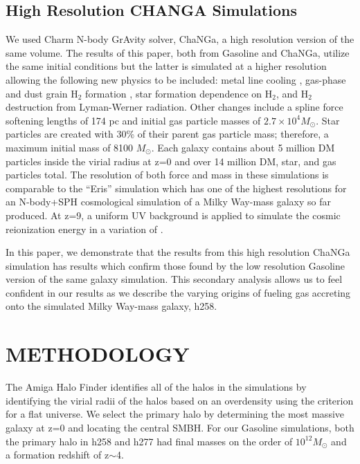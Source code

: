 \documentclass[12pt,headA,chapB]{fiskthesis}
\begin{document}
\section{\normalsize High Resolution CHANGA Simulations}

We used Charm N-body GrAvity solver, ChaNGa, a high resolution version of the same volume. The results of this paper, both from Gasoline and ChaNGa, utilize the same initial conditions but the latter is simulated at a higher resolution allowing the following new physics to be included: metal line cooling \citep{Christensen2012,Shen2010}, gas-phase and dust grain H$_2$ formation \citep{Christensen2014}, star formation dependence on H$_2$, and H$_2$ destruction from Lyman-Werner radiation. Other changes include a spline force softening lengths of 174 pc and initial gas particle masses of $2.7 \times 10^4 M_{\odot}$. Star particles are created with 30\% of their parent gas particle mass; therefore, a maximum initial mass of 8100 $M_{\odot}$. Each galaxy contains about 5 million DM particles inside the virial radius at z=0 and over 14 million DM, star, and gas particles total. The resolution of both force and mass in these simulations is comparable to the ``Eris'' simulation which has one of the highest resolutions for an N-body+SPH cosmological simulation of a Milky Way-mass galaxy so far produced.  At z=9, a uniform UV background is applied to simulate the cosmic reionization energy in a variation of \cite{Haardt2012}.

In this paper, we demonstrate that the results from this high resolution ChaNGa simulation has results which confirm those found by the low resolution Gasoline version of the same galaxy simulation. This secondary analysis allows us to feel confident in our results as we describe the varying origins of fueling gas accreting onto the simulated Milky Way-mass galaxy, h258.


\chapter{\normalsize METHODOLOGY}
\thispagestyle{empty}

The Amiga Halo Finder identifies all of the halos in the simulations by identifying the virial radii of the halos based on an overdensity using the criterion for a flat universe. \citep{Knebe2001,Knollmann2009,Gill2004} We select the primary halo by determining the most massive galaxy at z=0 and locating the central SMBH. For our Gasoline simulations, both the primary halo in h258 and h277 had final masses on the order of $10^{12} M_{\odot}$ and a formation redshift of z$\sim$4.  
\end{document}
